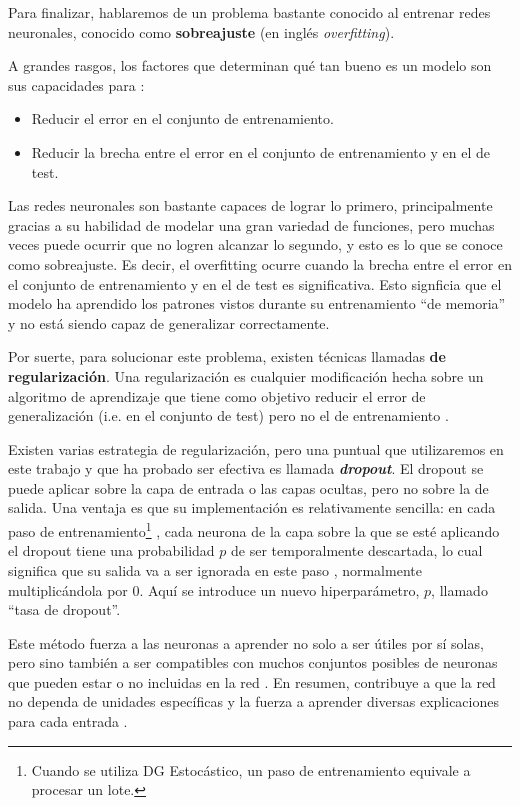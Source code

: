 \documentclass[../../main.tex]{subfiles}
\begin{document}
\bigskip
Para finalizar, hablaremos de un problema bastante conocido al entrenar redes neuronales,
conocido como \textbf{sobreajuste} (en inglés \textit{overfitting}).

A grandes rasgos, los factores que determinan qué tan bueno es un modelo son sus capacidades
para \cite{deep-learning}:
\begin{itemize}[itemsep=0.1cm]
    \item Reducir el error en el conjunto de entrenamiento.
    \item Reducir la brecha entre el error en el conjunto de entrenamiento y en el de
    test.
\end{itemize}

Las redes neuronales son bastante capaces de lograr lo primero, principalmente gracias a
su habilidad de modelar una gran variedad de funciones, pero muchas veces puede ocurrir
que no logren alcanzar lo segundo, y esto es lo que se conoce como sobreajuste. Es decir,
el overfitting ocurre cuando la brecha entre el error en el conjunto de entrenamiento y en
el de test es significativa. Esto signficia que el modelo ha aprendido los patrones vistos
durante su entrenamiento ``de memoria'' y no está siendo capaz de generalizar correctamente.

Por suerte, para solucionar este problema, existen técnicas llamadas \textbf{de
regularización}. Una regularización es cualquier modificación hecha sobre un algoritmo de
aprendizaje que tiene como objetivo reducir el error de generalización (i.e. en el
conjunto de test) pero no el de entrenamiento \cite{deep-learning}.

Existen varias estrategia de regularización, pero una puntual que utilizaremos en este
trabajo y que ha probado ser efectiva es llamada \textbf{\textit{dropout}}. El dropout se
puede aplicar sobre la capa de entrada o las capas ocultas, pero no sobre la de salida.
Una ventaja es que su implementación es relativamente sencilla: en cada paso de
entrenamiento\footnote{Cuando se utiliza DG Estocástico, un paso de entrenamiento equivale
a procesar un lote.} , cada neurona de la capa sobre la que se esté aplicando el dropout
tiene una probabilidad \(p\) de ser temporalmente descartada, lo cual significa que su
salida va a ser ignorada en este paso \cite{hands-on-ML-sklearn-tf}, normalmente
multiplicándola por 0. Aquí se introduce un nuevo hiperparámetro, \(p\), llamado ``tasa de
dropout''.

Este método fuerza a las neuronas a aprender no solo a ser útiles por sí solas,
pero sino también a ser compatibles con muchos conjuntos posibles de neuronas que pueden
estar o no incluidas en la red \cite{ai-a-modern-approach}. En resumen, contribuye
a que la red no dependa de unidades específicas y la fuerza a aprender diversas
explicaciones para cada entrada \cite{ai-a-modern-approach}.
\end{document}
